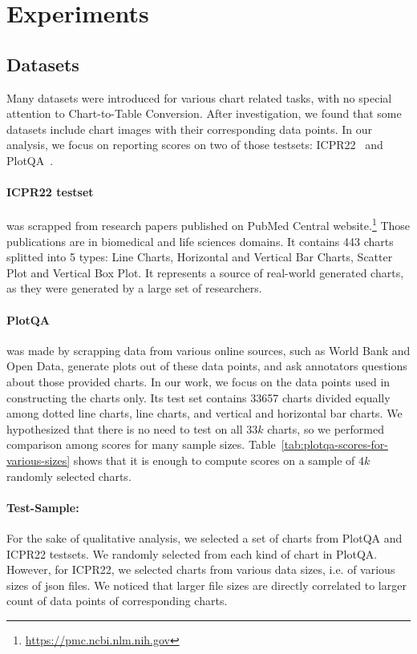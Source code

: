 \documentclass[
	letterpaper, %
]{jdf}
\begin{document}
\section{Experiments}\label{sect:experiments}
\subsection{Datasets}\label{ssect:datasets}
Many datasets were introduced for various chart related tasks, with no special attention to Chart-to-Table Conversion.
After investigation, we found that some datasets include chart images with their corresponding data points.
In our analysis, we focus on reporting scores on two of those testsets: ICPR22~\cite{rousseau2023pattern} and PlotQA~\cite{methani2020plotqa}.

\paragraph{ICPR22 testset~\cite{rousseau2023pattern}} was scrapped from research papers published on PubMed Central website.\footnote{\href{https://pmc.ncbi.nlm.nih.gov}{https://pmc.ncbi.nlm.nih.gov}}
Those publications are in biomedical and life sciences domains.
It contains 443 charts splitted into 5 types: Line Charts, Horizontal and Vertical Bar Charts, Scatter Plot and Vertical Box Plot.
It represents a source of real-world generated charts, as they were generated by a large set of researchers.

\paragraph{PlotQA~\cite{methani2020plotqa}} was made by scrapping data from various online sources, such as World Bank and Open Data, generate plots out of these data points, and ask annotators questions about those provided charts.
In our work, we focus on the data points used in constructing the charts only.
Its test set contains 33657 charts divided equally among dotted line charts, line charts, and vertical and horizontal bar charts.
We hypothesized that there is no need to test on all $33k$ charts, so we performed comparison among scores for many sample sizes.
Table~\ref{tab:plotqa-scores-for-various-sizes} shows that it is enough to compute scores on a sample of $4k$ randomly selected charts.

\paragraph{Test-Sample:} For the sake of qualitative analysis, we selected a set of charts from PlotQA and ICPR22 testsets.
We randomly selected from each kind of chart in PlotQA.
However, for ICPR22, we selected charts from various data sizes, i.e. of various sizes of json files.
We noticed that larger file sizes are directly correlated to larger count of data points of corresponding charts.
\end{document}
